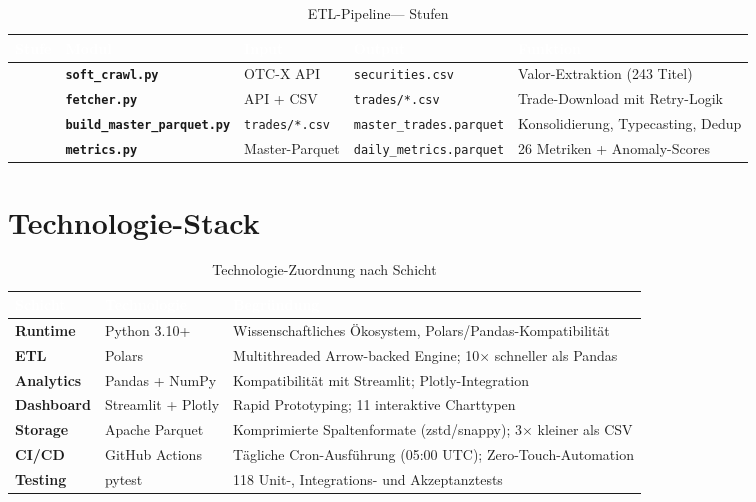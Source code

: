 \documentclass[12pt, a4paper, oneside]{report}
\newcommand{\code}[1]{\texttt{\small\textcolor{darknavy}{#1}}}
\begin{document}
\begin{table}[H]
\centering
\caption{ETL-Pipeline\;--- Stufen}
\label{tab:pipeline}
\begin{tabularx}{\textwidth}{>{\centering\arraybackslash}p{1cm} >{\bfseries\sffamily}p{3.5cm} p{3cm} p{3.5cm} X}
  \toprule
  \rowcolor{darknavy} \textcolor{white}{Stufe} & \textcolor{white}{Modul} & \textcolor{white}{Input} & \textcolor{white}{Output} & \textcolor{white}{Funktion} \\
  \midrule
  1 & \code{soft\_crawl.py}           & OTC-X API          & \code{securities.csv}          & Valor-Extraktion (243 Titel) \\
  2 & \code{fetcher.py}              & API + CSV           & \code{trades/*.csv}            & Trade-Download mit Retry-Logik \\
  3 & \code{build\_master\_parquet.py} & \code{trades/*.csv} & \code{master\_trades.parquet}  & Konsolidierung, Typecasting, Dedup \\
  4 & \code{metrics.py}              & Master-Parquet      & \code{daily\_metrics.parquet}  & 26 Metriken + Anomaly-Scores \\
  \bottomrule
\end{tabularx}
\end{table}

\section{Technologie-Stack}

\begin{table}[H]
\centering
\caption{Technologie-Zuordnung nach Schicht}
\label{tab:techstack}
\begin{tabularx}{\textwidth}{>{\bfseries\sffamily}p{2.5cm} p{3.5cm} X}
  \toprule
  \rowcolor{darknavy} \textcolor{white}{Schicht} & \textcolor{white}{Technologie} & \textcolor{white}{Begr\"undung} \\
  \midrule
  Runtime     & Python 3.10+   & Wissenschaftliches \"Okosystem, Polars/Pandas-Kompatibilit\"at \\
  ETL         & Polars         & Multithreaded Arrow-backed Engine; 10$\times$ schneller als Pandas \\
  Analytics   & Pandas + NumPy & Kompatibilit\"at mit Streamlit; Plotly-Integration \\
  Dashboard   & Streamlit + Plotly & Rapid Prototyping; 11 interaktive Charttypen \\
  Storage     & Apache Parquet & Komprimierte Spaltenformate (zstd/snappy); 3$\times$ kleiner als CSV \\
  CI/CD       & GitHub Actions & T\"agliche Cron-Ausf\"uhrung (05:00 UTC); Zero-Touch-Automation \\
  Testing     & pytest         & 118 Unit-, Integrations- und Akzeptanztests \\
  \bottomrule
\end{tabularx}
\end{table}
\end{document}
